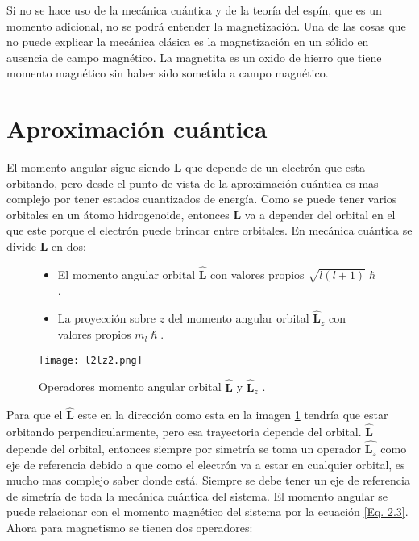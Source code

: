 \documentclass[11pt,fleqn]{book}
\renewcommand{\vec}[1]{\mathbf{#1}}
\begin{document}
Si no se hace uso de la mecánica cuántica y de la teoría del espín, que es un momento adicional, no se podrá entender la magnetización. Una de las cosas que no puede explicar la mecánica clásica es la magnetización en un sólido en ausencia de campo magnético. La magnetita es un oxido de hierro que tiene momento magnético sin haber sido sometida a campo magnético.

\section{Aproximación cuántica}

El momento angular sigue siendo $\vec{L}$ que depende de un electrón que esta orbitando, pero desde el punto de vista de la aproximación cuántica es mas complejo por tener estados cuantizados de energía. Como se puede tener varios orbitales en un átomo hidrogenoide, entonces $\vec{L}$ va a depender del orbital en el que este porque el electrón puede brincar entre orbitales. En mecánica cuántica se divide $\vec{L}$ en dos: 

\begin{figure}[H]
    \begin{minipage}[c]{0.4\linewidth}
       \begin{itemize}
           \item El momento angular orbital $\vec{\hat{L}}$ con valores propios $\sqrt{l(l+1)}\hslash$.
            \item La proyección sobre $z$ del momento angular orbital $\hat{\vec{L}}_{z}$ con valores propios $m_{l}\hslash$.
      \end{itemize}
    \end{minipage}\hspace{2mm}
    \begin{minipage}[c]{0.6\linewidth}
        \centering
        \texttt{[image: l2lz2.png]}
        \caption{Operadores momento angular orbital $\vec{\hat{L}}$ y $\hat{\vec{L}}_{z}$ .}
        \label{Fig. 2.7}
    \end{minipage}
\end{figure}
\vspace{-4mm}

Para que el $\hat{\vec{L}}$ este en la dirección como esta en la imagen \ref{Fig. 2.7} tendría que estar orbitando perpendicularmente, pero esa trayectoria depende del orbital. $\hat{\vec{L}}$ depende del orbital, entonces siempre por simetría se toma un operador $\hat{\vec{L}_{z}}$ como eje de referencia debido a que como el electrón va a estar en cualquier orbital, es mucho mas complejo saber donde está. Siempre se debe tener un eje de referencia de simetría de toda la mecánica cuántica del sistema. El momento angular se puede relacionar con el momento magnético del sistema por la ecuación \ref{Eq. 2.3}. Ahora para magnetismo se tienen dos operadores:
\end{document}
